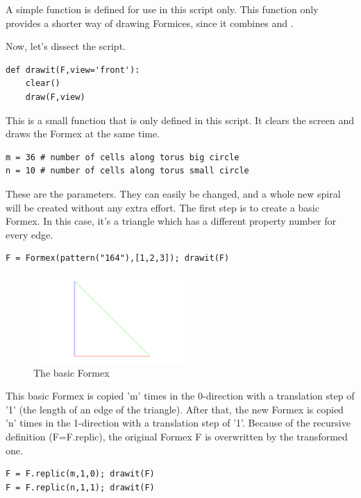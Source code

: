 {A simple function  is defined for use in this script only. This function only provides a shorter way of drawing Formices, since it combines  and . 

Now, let's dissect the script.

\begin{verbatim}
def drawit(F,view='front'):
    clear()
    draw(F,view)
\end{verbatim}
This is a small function that is only defined in this script. It clears the screen and draws the Formex at the same time. 

\begin{verbatim}
m = 36 # number of cells along torus big circle
n = 10 # number of cells along torus small circle
\end{verbatim}
These are the parameters. They can easily be changed, and a whole new spiral will be created without any extra effort.
The first step is to create a basic Formex. In this case, it's a triangle which has a different property number for every edge.
\begin{verbatim}
F = Formex(pattern("164"),[1,2,3]); drawit(F)  
\end{verbatim}
\begin{figure}[h]
  \centering
  \begin{makeimage}
  \end{makeimage}
  \begin{latexonly}
    \includegraphics[width=6cm]{images/spiral-000}
  \end{latexonly}
  \begin{htmlonly}
  \end{htmlonly}  
  \caption{The basic Formex}
\end{figure}

This basic Formex is copied 'm' times in the 0-direction with a translation 
step of '1' (the length of an edge of the triangle). After that, the new 
Formex is copied 'n' times in the 1-direction with a translation step of '1'. 
Because of the recursive definition (F=F.replic), the original Formex F is 
overwritten by the transformed one.
\begin{verbatim}
F = F.replic(m,1,0); drawit(F)
F = F.replic(n,1,1); drawit(F)
\end{verbatim}

}

